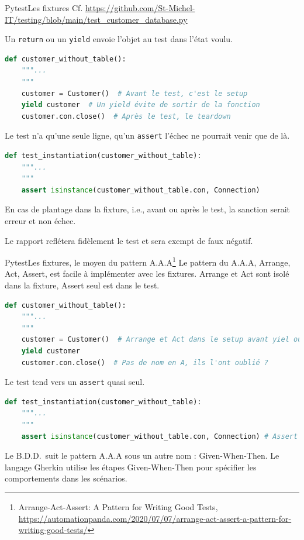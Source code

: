 \documentclass{beamer}
\begin{document}
    \begin{frame}[fragile]{Pytest}{Les fixtures}
        \transdissolve
        Cf. \url{https://github.com/St-Michel-IT/testing/blob/main/test_customer_database.py}

        Un \lstinline{return} ou un \lstinline{yield} envoie l'objet au test dans l'état voulu.
        \begin{lstlisting}[language=Python]
def customer_without_table():
    """...
    """
    customer = Customer()  # Avant le test, c'est le setup
    yield customer  # Un yield évite de sortir de la fonction
    customer.con.close()  # Après le test, le teardown
        \end{lstlisting}
        Le test n'a qu'une seule ligne, qu'un \lstinline{assert} l'échec ne
        pourrait venir que de là.
        \begin{lstlisting}[language=Python]
def test_instantiation(customer_without_table):
    """...
    """
    assert isinstance(customer_without_table.con, Connection)
        \end{lstlisting}
        En cas de plantage dans la fixture, i.e., avant ou après le test, la sanction
        serait erreur et non échec.

        Le rapport reflétera fidèlement le test et sera exempt de faux négatif.
    \end{frame}

    \begin{frame}[fragile]{Pytest}{Les fixtures, le moyen du pattern A.A.A\footnote{Arrange-Act-Assert: A Pattern for Writing Good Tests, \url{https://automationpanda.com/2020/07/07/arrange-act-assert-a-pattern-for-writing-good-tests/}}}
        \transdissolve
        Le pattern du A.A.A, Arrange, Act, Assert, est facile à implémenter avec les fixtures.
        Arrange et Act sont isolé dans la fixture, Assert seul est dans le test.

        \begin{lstlisting}[language=Python]
def customer_without_table():
    """...
    """
    customer = Customer()  # Arrange et Act dans le setup avant yiel ou return
    yield customer
    customer.con.close()  # Pas de nom en A, ils l'ont oublié ?
        \end{lstlisting}
        Le test tend vers un \lstinline{assert} quasi seul.
        \begin{lstlisting}[language=Python]
def test_instantiation(customer_without_table):
    """...
    """
    assert isinstance(customer_without_table.con, Connection) # Assert
        \end{lstlisting}
        Le B.D.D.~suit le pattern A.A.A sous un autre nom : Given-When-Then.
        Le langage Gherkin utilise les étapes Given-When-Then pour spécifier les comportements dans les scénarios.
    \end{frame}
\end{document}
